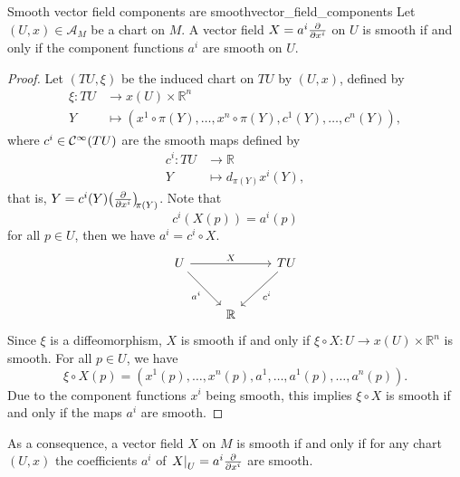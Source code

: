 \begin{lemma}{Smooth vector field components are smooth}{vector_field_components}
    Let \((U,x)\in \mathscr{A}_M\) be a chart on \(M\). A vector field \(X = a^i \bfield{x^i}\) on \(U\) is smooth if and only if the component functions \(a^i\) are smooth on \(U\).
\end{lemma}
\begin{proof}
    Let \((TU, \xi)\) be the induced chart on \(TU\) by \((U, x)\), defined by
    \begin{align*}
        \xi : TU &\to x(U)\times \mathbb{R}^n\\
               Y &\mapsto (x^1 \circ \pi(Y), \dots, x^n \circ \pi(Y), c^1(Y), \dots, c^n(Y)),
    \end{align*}
    where \(c^i \in \mathcal{C}^\infty(TU)\) are the smooth maps defined by
    \begin{align*}
        c^i : TU &\to \mathbb{R}\\
               Y &\mapsto d_{\pi(Y)}x^i(Y),
    \end{align*}
    that is, \(Y = c^i(Y) \bvec{x^i}{\pi(Y)}\). Note that
    \begin{equation*}
        c^i(X(p)) = a^i(p)
    \end{equation*}
    for all \(p \in U\), then we have \(a^i = c^i \circ X\).
    \begin{equation*}
        \begin{tikzcd}[column sep = normal, row sep = large]
            U \arrow{rr}{X}\arrow[swap]{dr}{a^i} && TU\arrow{dl}{c^i}\\
                                                 & \mathbb{R}
        \end{tikzcd}
    \end{equation*}
    Since \(\xi\) is a diffeomorphism, \(X\) is smooth if and only if \(\xi \circ X : U \to x(U) \times \mathbb{R}^n\) is smooth. For all \(p \in U\), we have
    \begin{equation*}
        \xi \circ X(p) = (x^1(p), \dots, x^n(p), a^1, \dots, a^1(p), \dots, a^n(p)).
    \end{equation*}
    Due to the component functions \(x^i\) being smooth, this implies \(\xi \circ X\) is smooth if and only if the maps \(a^i\) are smooth.
\end{proof}
\begin{remark}
    As a consequence\cite{tu_manifolds}, a vector field \(X\) on \(M\) is smooth if and only if for any chart \((U, x)\) the coefficients \(a^i\) of \(\restrict{X}{U} = a^i\bfield{x^i}\) are smooth.
\end{remark}


